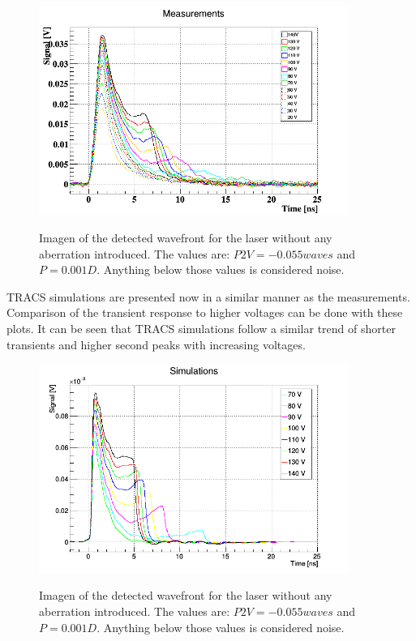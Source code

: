 \begin{figure}[H]
	\centering
	\includegraphics[width=0.9\textwidth]{c1.png}
	\label{fig:mues2}
	\caption{Imagen of the detected wavefront for the laser without any aberration introduced. The values are: $P2V = -0.055waves$ and $P = 0.001D$. Anything below those values is considered noise.}
\end{figure}
				
TRACS simulations are presented now in a similar manner as the measurements. Comparison of the transient response to higher voltages can be done with these plots. It can be seen that TRACS simulations follow a similar trend of shorter transients and higher second peaks with increasing voltages.

\begin{figure}[H]
	\centering
	\centering
	\includegraphics[width=0.9\textwidth]{AllSims.png}
	\label{fig:mues2}
	\caption{Imagen of the detected wavefront for the laser without any aberration introduced. The values are: $P2V = -0.055waves$ and $P = 0.001D$. Anything below those values is considered noise.}
\end{figure}


